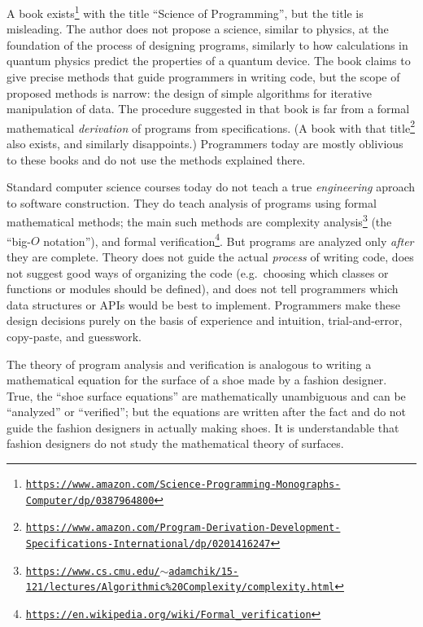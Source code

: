 A book exists\footnote{\texttt{\href{https://www.amazon.com/Science-Programming-Monographs-Computer/dp/0387964800}{https://www.amazon.com/Science-Programming-Monographs-Computer/dp/0387964800}}}
with the title ``Science of Programming'', but the title is misleading.
The author does not propose a science, similar to physics, at the
foundation of the process of designing programs, similarly to how
calculations in quantum physics predict the properties of a quantum
device. The book claims to give precise methods that guide programmers
in writing code, but the scope of proposed methods is narrow: the
design of simple algorithms for iterative manipulation of data. The
procedure suggested in that book is far from a formal mathematical
\emph{derivation} of programs from specifications. (A book with that
title\footnote{\texttt{\href{https://www.amazon.com/Program-Derivation-Development-Specifications-International/dp/0201416247}{https://www.amazon.com/Program-Derivation-Development-Specifications-International/dp/0201416247}}}
also exists, and similarly disappoints.) Programmers today are mostly
oblivious to these books and do not use the methods explained there.

Standard computer science courses today do not teach a true \emph{engineering}
aproach to software construction. They do teach analysis of programs
using formal mathematical methods; the main such methods are complexity
analysis\footnote{\texttt{\href{https://www.cs.cmu.edu/~adamchik/15-121/lectures/Algorithmic\%20Complexity/complexity.html}{https://www.cs.cmu.edu/$\sim$adamchik/15-121/lectures/Algorithmic\%20Complexity/complexity.html}}}
(the ``big-$O$ notation''), and formal verification\footnote{\texttt{\href{https://en.wikipedia.org/wiki/Formal_verification}{https://en.wikipedia.org/wiki/Formal\_verification}}}.
But programs are analyzed only \emph{after} they are complete. Theory
does not guide the actual \emph{process} of writing code, does not
suggest good ways of organizing the code (e.g.~choosing which classes
or functions or modules should be defined), and does not tell programmers
which data structures or APIs would be best to implement. Programmers
make these design decisions purely on the basis of experience and
intuition, trial-and-error, copy-paste, and guesswork. 

The theory of program analysis and verification is analogous to writing
a mathematical equation for the surface of a shoe made by a fashion
designer. True, the ``shoe surface equations'' are mathematically
unambiguous and can be ``analyzed'' or ``verified''; but the equations
are written after the fact and do not guide the fashion designers
in actually making shoes. It is understandable that fashion designers
do not study the mathematical theory of surfaces.

